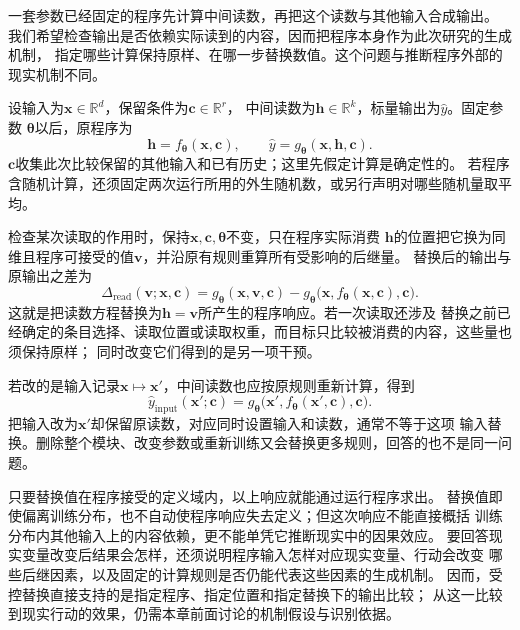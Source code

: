 \begin{example}[计算模型中的受控替换]
  \label{ex:causal-controlled-computation}
  一套参数已经固定的程序先计算中间读数，再把这个读数与其他输入合成输出。
  我们希望检查输出是否依赖实际读到的内容，因而把程序本身作为此次研究的生成机制，
  指定哪些计算保持原样、在哪一步替换数值。这个问题与推断程序外部的现实机制不同。

  设输入为\(\bm x\in\mathbb R^d\)，保留条件为\(\bm c\in\mathbb R^r\)，
  中间读数为\(\bm h\in\mathbb R^k\)，标量输出为\(\widehat y\)。固定参数
  \(\bm\theta\)以后，原程序为
  \[
    \bm h=f_{\bm\theta}(\bm x,\bm c),\qquad
    \widehat y=g_{\bm\theta}(\bm x,\bm h,\bm c).
  \]
  \(\bm c\)收集此次比较保留的其他输入和已有历史；这里先假定计算是确定性的。
  若程序含随机计算，还须固定两次运行所用的外生随机数，或另行声明对哪些随机量取平均。

  检查某次读取的作用时，保持\(\bm x,\bm c,\bm\theta\)不变，只在程序实际消费
  \(\bm h\)的位置把它换为同维且程序可接受的值\(\bm v\)，并沿原有规则重算所有受影响的后继量。
  替换后的输出与原输出之差为
  \begin{equation}
    \Delta_{\mathrm{read}}(\bm v;\bm x,\bm c)
    =g_{\bm\theta}(\bm x,\bm v,\bm c)
    -g_{\bm\theta}\bigl(\bm x,f_{\bm\theta}(\bm x,\bm c),\bm c\bigr).
    \label{eq:causal-computational-read-replacement}
  \end{equation}
  这就是把读数方程替换为\(\bm h=\bm v\)所产生的程序响应。若一次读取还涉及
  替换之前已经确定的条目选择、读取位置或读取权重，而目标只比较被消费的内容，这些量也须保持原样；
  同时改变它们得到的是另一项干预。

  若改的是输入记录\(\bm x\mapsto\bm x'\)，中间读数也应按原规则重新计算，得到
  \[
    \widehat y_{\mathrm{input}}(\bm x';\bm c)
    =g_{\bm\theta}\bigl(\bm x',f_{\bm\theta}(\bm x',\bm c),\bm c\bigr).
  \]
  把输入改为\(\bm x'\)却保留原读数，对应同时设置输入和读数，通常不等于这项
  输入替换。删除整个模块、改变参数或重新训练又会替换更多规则，回答的也不是同一问题。

  只要替换值在程序接受的定义域内，以上响应就能通过运行程序求出。
  替换值即使偏离训练分布，也不自动使程序响应失去定义；但这次响应不能直接概括
  训练分布内其他输入上的内容依赖，更不能单凭它推断现实中的因果效应。
  要回答现实变量改变后结果会怎样，还须说明程序输入怎样对应现实变量、行动会改变
  哪些后继因素，以及固定的计算规则是否仍能代表这些因素的生成机制。
  因而，受控替换直接支持的是指定程序、指定位置和指定替换下的输出比较；
  从这一比较到现实行动的效果，仍需本章前面讨论的机制假设与识别依据。
\end{example}

